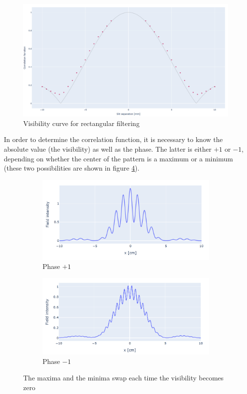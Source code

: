 \begin{figure}[!ht]
    \centering
    \includegraphics[width = \textwidth]{Img/vis.png}
    \caption{Visibility curve for rectangular filtering}
    \label{vis_f}
\end{figure}

In order to determine the correlation function, it is necessary to know the absolute value (the visibility) as well as the phase. The latter is either $+1$ or 
$-1$, depending on whether the center of the pattern is a maximum or a minimum (these two possibilities are shown in figure \ref{swap}). 

\begin{figure}[!ht]
    \centering
    \begin{subfigure}[]{0.49\textwidth}
        \includegraphics[width = \textwidth]{Img/patt_1.png}
        \caption{Phase $+1$}
        \label{patt-1}
    \end{subfigure}
    \hfill
    \begin{subfigure}[]{0.49\textwidth}
        \includegraphics[width = \textwidth]{Img/patt_2.png}
        \caption{Phase $-1$}
        \label{patt-2}
    \end{subfigure}
    \caption{The maxima and the minima swap each time the visibility becomes zero}
    \label{swap}
\end{figure}

